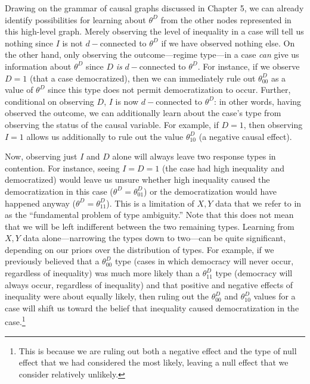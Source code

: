 \documentclass[12pt,]{book}
\let\rmarkdownfootnote\footnote%
\def\footnote{\protect\rmarkdownfootnote}
\begin{document}
Drawing on the grammar of causal graphs discussed in Chapter 5, we can already identify possibilities for learning about \(\theta^D\) from the other nodes represented in this high-level graph. Merely observing the level of inequality in a case will tell us nothing since \(I\) is not \(d-\)connected to \(\theta^D\) if we have observed nothing else. On the other hand, only observing the outcome---regime type---in a case \emph{can} give us information about \(\theta^D\) since \(D\) \emph{is} \(d-\)connected to \(\theta^D\). For instance, if we observe \(D=1\) (that a case democratized), then we can immediately rule out \(\theta_{00}^D\) as a value of \(\theta^D\) since this type does not permit democratization to occur. Further, conditional on observing \(D\), \(I\) is now \(d-\)connected to \(\theta^D\): in other words, having observed the outcome, we can additionally learn about the case's type from observing the status of the causal variable. For example, if \(D=1\), then observing \(I=1\) allows us additionally to rule out the value \(\theta_{10}^D\) (a negative causal effect).

Now, observing just \(I\) and \(D\) alone will always leave two response types in contention. For instance, seeing \(I=D=1\) (the case had high inequality and democratized) would leave us unsure whether high inequality caused the democratization in this case (\(\theta^D=\theta_{01}^D\)) or the democratization would have happened anyway (\(\theta^D=\theta_{11}^D\)). This is a limitation of \(X, Y\) data that we refer to in \citet{humphreys2015mixing} as the ``fundamental problem of type ambiguity.'' Note that this does not mean that we will be left indifferent between the two remaining types. Learning from \(X, Y\) data alone---narrowing the types down to two---can be quite significant, depending on our priors over the distribution of types. For example, if we previously believed that a \(\theta_{00}^D\) type (cases in which democracy will never occur, regardless of inequality) was much more likely than a \(\theta_{11}^D\) type (democracy will always occur, regardless of inequality) and that positive and negative effects of inequality were about equally likely, then ruling out the \(\theta_{00}^D\) and \(\theta_{10}^D\) values for a case will shift us toward the belief that inequality caused democratization in the case.\footnote{This is because we are ruling out both a negative effect and the type of null effect that we had considered the most likely, leaving a null effect that we consider relatively unlikely.}
\end{document}

